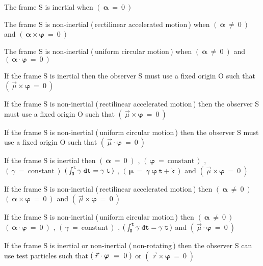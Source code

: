 \documentclass[10pt,fleqn]{article}
\begin{document}
\par \bigskip \medskip
\noindent The frame S is inertial when {\small $( \: \boldsymbol{\alpha} ~=~ 0 \: )$}
\par \medskip \smallskip
\noindent The frame S is non-inertial (\,rectilinear accelerated motion\,) when {\small $( \: \boldsymbol{\alpha} ~\ne~ 0 \: )$} and {\small $( \: \boldsymbol{\alpha} \times \boldsymbol{\varphi} ~=~ 0 \: )$}
\par \medskip \smallskip
\noindent The frame S is non-inertial (\,uniform circular motion\,) when {\small $( \: \boldsymbol{\alpha} ~\ne~ 0 \: )$} and {\small $( \: \boldsymbol{\alpha} \cdot \boldsymbol{\varphi} ~=~ 0 \: )$}
\par \medskip \smallskip
\noindent If the frame S is inertial then the observer S must use a fixed origin O such that {\small $( \: \vec{\mu} \times \boldsymbol{\varphi} ~=~ 0 \: )$} 
\par \medskip \smallskip
\noindent If the frame S is non-inertial (\,rectilinear accelerated motion\,) then the observer S must use a fixed origin O such that {\small $( \: \vec{\mu} \times \boldsymbol{\varphi} ~=~ 0 \: )$} 
\par \medskip \smallskip
\noindent If the frame S is non-inertial (\,uniform circular motion\,) then the observer S must use a fixed origin O such that {\small $( \: \vec{\mu} \cdot \boldsymbol{\varphi} ~=~ 0 \: )$} 
\par \medskip \smallskip
\noindent If the frame S is inertial then {\small $( \: \boldsymbol{\alpha} ~=~ 0 \; )$ , $( \, \boldsymbol{\varphi} ~=~ \mathrm{constant} \, )$ , $( \, \gamma ~=~ \mathrm{constant} \, )$ $( \, \int_{\hspace{-0.045em}\mathtt{O}}^{\mathtt{t}} \gamma \; \mathtt{dt} = \gamma \; \mathtt{t} \, )$ , $( \, \boldsymbol{\mu} ~=~ \gamma \; \boldsymbol{\varphi} \: \mathtt{t} + \mathtt{k} \, )$} and {\small $( \: \vec{\mu} \times \boldsymbol{\varphi} ~=~ 0 \: )$}
\par \medskip \smallskip
\noindent If the frame S is non-inertial (\,rectilinear accelerated motion\,) then {\small $( \: \boldsymbol{\alpha} ~\ne~ 0 \: )$ \hbox {$( \: \boldsymbol{\alpha} \times \boldsymbol{\varphi} ~=~ 0 \: )$}} and {\small $( \: \vec{\mu} \times \boldsymbol{\varphi} ~=~ 0 \: )$}
\par \medskip \smallskip
\noindent If the frame S is non-inertial (\,uniform circular motion\,) then {\small $( \: \boldsymbol{\alpha} ~\ne~ 0 \: )$ \hbox {$( \: \boldsymbol{\alpha} \cdot \boldsymbol{\varphi} ~=~ 0 \: )$} , $( \, \gamma ~=~ \mathrm{constant} \, )$ , $( \, \int_{\hspace{-0.045em}\mathtt{O}}^{\mathtt{t}} \gamma \; \mathtt{dt} = \gamma \; \mathtt{t} \, )$} and {\small $( \: \vec{\mu} \cdot \boldsymbol{\varphi} ~=~ 0 \: )$}
\par \medskip \smallskip
\noindent If the frame S is inertial or non-inertial (\,non-rotating\,) then the observer S can use test particles such that {\small $( \; \vec{r} \hspace{+0.045em}\cdot \boldsymbol{\varphi} ~=~ 0 \; )$} {or} {\small $( \; \vec{r} \times \boldsymbol{\varphi} ~=~ 0 \; )$}
\end{document}

